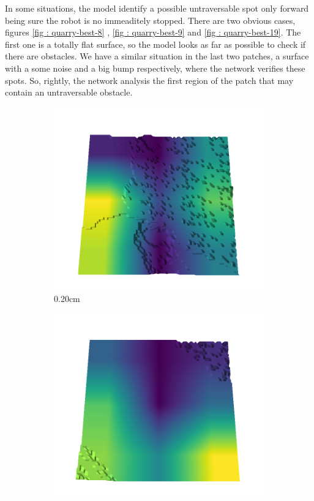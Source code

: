 In some situations, the model identify a possible untraversable spot only forward being sure the robot is no immeaditely stopped. There are two obvious cases, figures \ref{fig : quarry-best-8} ,  \ref{fig : quarry-best-9} and \ref{fig : quarry-best-19}. The first one is a totally flat surface, so the model looks as far as possible to check if there are obstacles. We have a similar situation in the last two patches, a surface with a some noise and a big bump respectively, where the network verifies these spots. So, rightly, the network analysis the first region of the patch that may contain an untraversable obstacle. 
\begin{figure}[H]
    \centering
    \begin{subfigure}[b]{0.192\linewidth}
    \includegraphics[width=\linewidth]{../img/5/quarry/best/20-patch-3d-majavi-colormap-0.png}
    \caption{0.20cm}
    \label{fig : quarry-best-1}
    \end{subfigure}
    \begin{subfigure}[b]{0.192\linewidth}
    \includegraphics[width=\linewidth]{../img/5/quarry/best/25-patch-3d-majavi-colormap-10.png}

\end{subfigure}
\end{figure}
